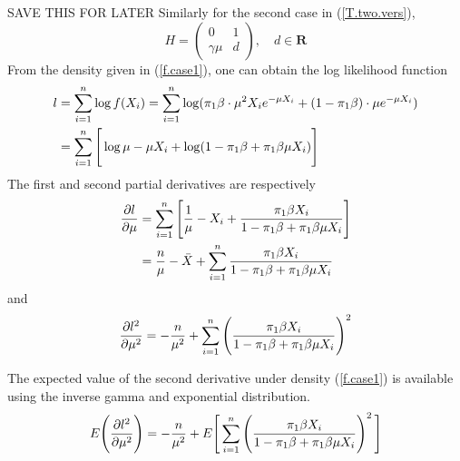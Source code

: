 \documentclass[11pt]{article}
\newcommand{\cred}{ \color{red}}
\begin{document}
{\cred SAVE THIS FOR LATER
Similarly for the second case in (\ref{T.two.vers}), 
\begin{equation}
\label{ }H=
\begin{pmatrix}
    0 & 1   \\
     \gamma \mu & d 
\end{pmatrix}, \quad  d \in \mathbf{ R}
\end{equation}
}
%
From the density given in (\ref{f.case1}), one can obtain the log likelihood function
\begin{align}
\label{}
   l&=\sum^n_{i=1}\log f(X_i)=\sum^n_{i=1}\log (\pi_1\beta \cdot \mu^2 X_i e^{-\mu X_i} +(1-\pi_1 \beta)\cdot \mu e^{-\mu X_i})  \\
   &=\sum^n_{i=1}\Bigg{[} \log \mu -\mu X_i+\log (1-\pi_1 \beta+\pi_1 \beta \mu X_i)  \Bigg{]} 
\end{align}
The first and second partial derivatives are respectively
\begin{align}
\label{}
    \frac{\partial l}{\partial \mu}&=  \sum^n_{i=1}\Bigg{[} \frac{1}{\mu}-X_i+\frac{\pi_1 \beta X_i}{1-\pi_1 \beta+\pi_1 \beta \mu X_i}\Bigg{]}\\
    & = \frac{n}{\mu}-\bar{X}+\sum^n_{i=1} \frac{\pi_1 \beta X_i}{1-\pi_1 \beta+\pi_1 \beta \mu X_i}
\end{align}
and
\begin{align}
\label{}
    \frac{\partial l^2}{\partial \mu^2}&=   -\frac{n}{\mu^2}+\sum^n_{i=1} \Bigg{(}\frac{\pi_1 \beta X_i}{1-\pi_1 \beta+\pi_1 \beta \mu X_i}\Bigg{)}^2 \\
\end{align}

The expected value of the second derivative under density (\ref{f.case1}) is available using the inverse gamma and exponential distribution.
\begin{align}
\label{}
    E\Bigg{(}\frac{\partial l^2}{\partial \mu^2} \Bigg{)}&=   -\frac{n}{\mu^2}+E \Bigg{[}\sum^n_{i=1} \Bigg{(}\frac{\pi_1 \beta X_i}{1-\pi_1 \beta+\pi_1 \beta \mu X_i}\Bigg{)}^2 \, \Bigg{]}\\
\end{align}
\end{document}
